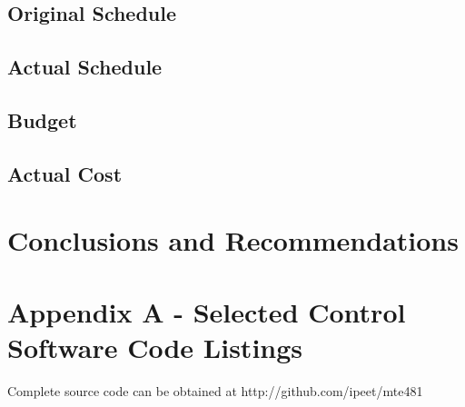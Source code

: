 \documentclass[oneside,final,a4paper]{report}
\begin{document}
\section{Original Schedule}

\section{Actual Schedule}

\section{Budget}

\section{Actual Cost}


\chapter{Conclusions and Recommendations}

\renewcommand{\thesection}{A\thechapter.\arabic{section}}

\chapter*{Appendix A - Selected Control Software Code Listings}
Complete source code can be obtained at http://github.com/ipeet/mte481

\setcounter{chapter}{1}
\end{document}
